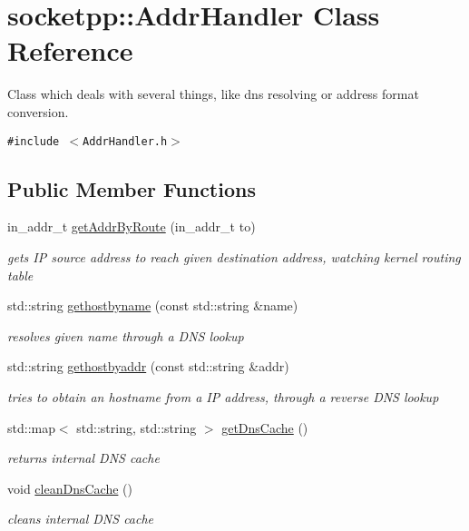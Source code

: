\hypertarget{classsocketpp_1_1AddrHandler}{
\section{socketpp::AddrHandler Class Reference}
\label{classsocketpp_1_1AddrHandler}
}
Class which deals with several things, like dns resolving or address format conversion.  


{\tt \#include $<$AddrHandler.h$>$}

\subsection*{Public Member Functions}
\begin{CompactItemize}
\item 
in\_\-addr\_\-t \hyperlink{classsocketpp_1_1AddrHandler_79db1454cc9c12bbd44b526f61ff84fb}{getAddrByRoute} (in\_\-addr\_\-t to)
\begin{CompactList}\small\item\em gets IP source address to reach given destination address, watching kernel routing table \item\end{CompactList}\item 
std::string \hyperlink{classsocketpp_1_1AddrHandler_19aebc1e9779dee4e5f06d7b39e18959}{gethostbyname} (const std::string \&name)
\begin{CompactList}\small\item\em resolves given name through a DNS lookup \item\end{CompactList}\item 
std::string \hyperlink{classsocketpp_1_1AddrHandler_2e9b9e6dc7ea4fc4a3500665b3f4062d}{gethostbyaddr} (const std::string \&addr)
\begin{CompactList}\small\item\em tries to obtain an hostname from a IP address, through a reverse DNS lookup \item\end{CompactList}\item 
std::map$<$ std::string, std::string $>$ \hyperlink{classsocketpp_1_1AddrHandler_4e10f2291b27d7db2a2860502721f960}{getDnsCache} ()
\begin{CompactList}\small\item\em returns internal DNS cache \item\end{CompactList}\item 
\hypertarget{classsocketpp_1_1AddrHandler_89a2929af6c042fd7e16661303dfabcb}{
void \hyperlink{classsocketpp_1_1AddrHandler_89a2929af6c042fd7e16661303dfabcb}{cleanDnsCache} ()}
\label{classsocketpp_1_1AddrHandler_89a2929af6c042fd7e16661303dfabcb}

\begin{CompactList}\small\item\em cleans internal DNS cache \item\end{CompactList}\end{CompactItemize}
